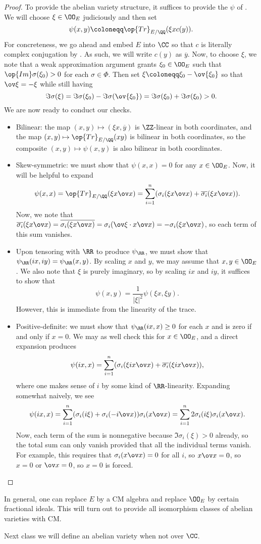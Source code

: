 \documentclass[../notes.tex]{subfiles}
\begin{document}
\begin{proof}
	To provide the abelian variety structure, it suffices to provide the $\psi$ of . We will choose $\xi\in\OO_E$ judiciously and then set
	\[\psi(x,y)\coloneqq\op{Tr}_{E/\QQ}(\xi x c(y)).\]
	For concreteness, we go ahead and embed $E$ into $\CC$ so that $c$ is literally complex conjugation by . As such, we will write $c(y)$ as $\overline y$. Now, to choose $\xi$, we note that a weak approximation argument grants $\xi_0\in\OO_E$ such that $\op{Im}\sigma(\xi_0)>0$ for each $\sigma\in\Phi$. Then set $\xi\coloneqq\xi_0-\ov{\xi_0}$ so that $\ov\xi=-\xi$ while still having
	\[\Im\sigma(\xi)=\Im\sigma(\xi_0)-\Im\sigma(\ov{\xi_0})=\Im\sigma(\xi_0)+\Im\sigma(\xi_0)>0.\]
	We are now ready to conduct our checks.
	\begin{itemize}
		\item Bilinear: the map $(x,y)\mapsto(\xi x,\overline y)$ is $\ZZ$-linear in both coordinates, and the map $(x,y)\mapsto\op{Tr}_{E/\QQ}(xy)$ is bilinear in both coordinates, so the composite $(x,y)\mapsto\psi(x,y)$ is also bilinear in both coordinates.
		\item Skew-symmetric: we must show that $\psi(x,x)=0$ for any $x\in\OO_E$. Now, it will be helpful to expand
		\[\psi(x,x)=\op{Tr}_{E/\QQ}(\xi x\ov x)=\sum_{i=1}^n(\sigma_i(\xi x\ov x)+\overline{\sigma_i}(\xi x\ov x)).\]
		Now, we note that $\overline{\sigma_i}(\xi x\ov x)=\overline{\sigma_i(\xi x\ov x)}=\sigma_i(\ov\xi\cdot x\ov x)=-\sigma_i(\xi x\ov x)$, so each term of this sum vanishes.
		\item Upon tensoring with $\RR$ to produce $\psi_\RR$, we must show that $\psi_\RR(ix,iy)=\psi_\RR(x,y)$. By scaling $x$ and $y$, we may assume that $x,y\in\OO_E$. We also note that $\xi$ is purely imaginary, so by scaling $ix$ and $iy$, it suffices to show that
		\[\psi(x,y)=\frac1{\left|\xi\right|^2}\psi(\xi x,\xi y).\]
		However, this is immediate from the linearity of the trace.
		\item Positive-definite: we must show that $\psi_\RR(ix,x)\ge0$ for each $x$ and is zero if and only if $x=0$. We may as well check this for $x\in\OO_E$, and a direct expansion produces
		\[\psi(ix,x)=\sum_{i=1}^n(\sigma_i(\xi ix\ov x)+\overline{\sigma_i}(\xi ix\ov x)),\]
		where one makes sense of $i$ by some kind of $\RR$-linearity. Expanding somewhat naively, we see
		\[\psi(ix,x)=\sum_{i=1}^n(\sigma_i(i\xi)+\sigma_i(-i\ov x))\sigma_i(x\ov x)=\sum_{i=1}^n2\sigma_i(i\xi)\sigma_i(x\ov x).\]
		Now, each term of the sum is nonnegative because $\Im\sigma_i(\xi)>0$ already, so the total sum can only vanish provided that all the individual terms vanish. For example, this requires that $\sigma_i(x\ov x)=0$ for all $i$, so $x\ov x=0$, so $x=0$ or $\ov x=0$, so $x=0$ is forced.
		\qedhere
	\end{itemize}
\end{proof}
\begin{remark}
	In general, one can replace $E$ by a CM algebra and replace $\OO_E$ by certain fractional ideals. This will turn out to provide all isomorphism classes of abelian varieties with CM.
\end{remark}
Next class we will define an abelian variety when not over $\CC$.
\end{document}
